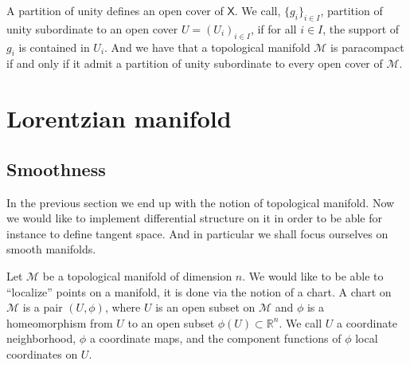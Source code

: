 \documentclass[10pt]{book}
\newcommand{\Mcal}{\mathcal{M}}
\newcommand{\Rbb}{\mathbb{R}}
\newcommand{\Xsf}{\mathsf{X}}
\theoremstyle{break}
\begin{document}
A partition of unity defines an open cover of $\Xsf$. We call, $\{g_i\}_{i \in I}$, partition of unity subordinate to an open cover $U=(U_i)_{i \in I}$, if for all $i \in I$, the support of $g_i$ is contained in $U_i$. And we have that a topological manifold $\Mcal$ is paracompact if and only if it admit a partition of unity subordinate to every open cover of $\Mcal$.


\section{Lorentzian manifold}


\subsection{Smoothness}


In the previous section we end up with the notion of topological manifold. Now we would like to implement differential structure on it in order to be able for instance to define tangent space. And in particular we shall focus ourselves on smooth manifolds.

\bigskip

Let $\Mcal$ be a topological manifold of dimension $n$. We would like to be able to ``localize'' points on a manifold, it is done via the notion of a chart. A chart on $\Mcal$ is a pair $(U,\phi)$, where $U$ is an open subset on $\Mcal$ and $\phi$ is a homeomorphism from $U$ to an open subset $\phi(U) \subset \Rbb^n$. We call $U$ a coordinate neighborhood, $\phi$ a coordinate maps, and the component functions of $\phi$ local coordinates on $U$.
\end{document}
